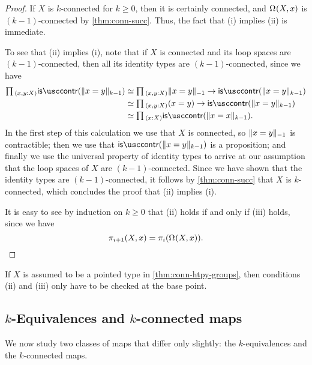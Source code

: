 \begin{proof}
  If $X$ is $k$-connected for $k\geq 0$, then it is certainly connected, and $\loopspace{X,x}$ is $(k-1)$-connected by \cref{thm:conn-succ}. Thus, the fact that (i) implies (ii) is immediate.

  To see that (ii) implies (i), note that if $X$ is connected and its loop spaces are $(k-1)$-connected, then all its identity types are $(k-1)$-connected, since we have
  \begin{align*}
    \prd{x,y:X}\iscontr(\trunc{k-1}{x=y}) & \simeq \prd{x,y:X}\trunc{-1}{x=y}\to\iscontr(\trunc{k-1}{x=y}) \\
    & \simeq \prd{x,y:X}(x=y)\to\iscontr(\trunc{k-1}{x=y}) \\
    & \simeq \prd{x:X}\iscontr(\trunc{k-1}{x=x}).
  \end{align*}
  In the first step of this calculation we use that $X$ is connected, so $\trunc{-1}{x=y}$ is contractible; then we use that $\iscontr(\trunc{k-1}{x=y})$ is a proposition; and finally we use the universal property of identity types to arrive at our assumption that the loop spaces of $X$ are $(k-1)$-connected. Since we have shown that the identity types are $(k-1)$-connected, it follows by \cref{thm:conn-succ} that $X$ is $k$-connected, which concludes the proof that (ii) implies (i).

  It is easy to see by induction on $k\geq 0$ that (ii) holds if and only if (iii) holds, since we have
  \begin{equation*}
    \pi_{i+1}(X,x)=\pi_i(\loopspace{X,x}).\qedhere
  \end{equation*}
\end{proof}

\begin{rmk}
  If $X$ is assumed to be a pointed type in \cref{thm:conn-htpy-groups}, then conditions (ii) and (iii) only have to be checked at the base point.
\end{rmk}

\subsection{\texorpdfstring{$k$}{k}-Equivalences and \texorpdfstring{$k$}{k}-connected maps}

We now study two classes of maps that differ only slightly: the $k$-equivalences and the $k$-connected maps. 

